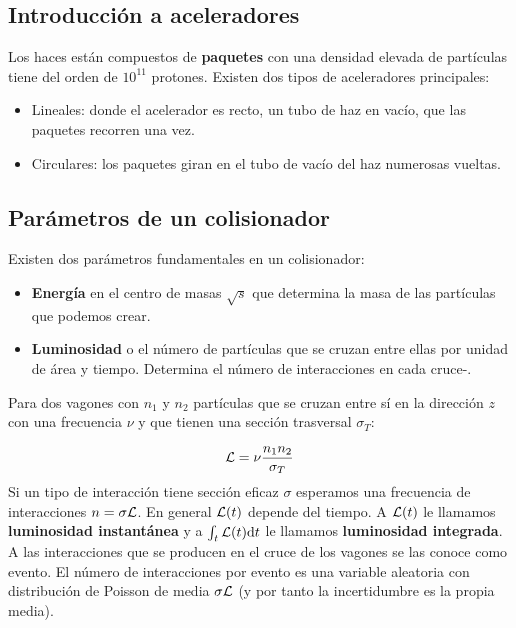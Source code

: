 \subsection{Introducción a aceleradores}

Los haces están compuestos de \textbf{paquetes} con una densidad elevada de partículas tiene del orden de $10^{11}$ protones. Existen dos tipos de aceleradores principales:

\begin{itemize}
	\item Lineales: donde el acelerador es recto, un tubo de haz en vacío, que las paquetes recorren una vez.
	\item Circulares: los paquetes giran en el tubo de vacío del haz numerosas vueltas.
\end{itemize}

\subsection{Parámetros de un colisionador}

Existen dos parámetros fundamentales en un colisionador:

\begin{itemize}
	\item \textbf{Energía} en el centro de masas $\sqrt{s}$ que determina la masa de las partículas que podemos crear.
	\item \textbf{Luminosidad} o el número de partículas que se cruzan entre ellas por unidad de área y tiempo. Determina el número de interacciones en cada cruce-.
\end{itemize}

Para dos vagones con $n_1$ y $n_2$ partículas que se cruzan entre sí en la dirección $z$ con una frecuencia $\nu$ y que tienen una sección trasversal $\sigma_T$:

\begin{equation}
	\mathcal{L} = \nu \frac{n_1n_2}{\sigma_T}
\end{equation}
Si un tipo de interacción tiene sección eficaz $\sigma$ esperamos una frecuencia de interacciones $n=\sigma \mathcal{L}$. En general $\mathcal{L}(t)$ depende del tiempo. A $\mathcal{L}(t)$ le llamamos \textbf{luminosidad instantánea} y a $\int_t \mathcal{L} (t)\mathrm{d} t$ le llamamos \textbf{luminosidad integrada}. A las interacciones que se producen en el cruce de los vagones se las conoce como evento. El número de interacciones por evento es una variable aleatoria con distribución de Poisson de media $\sigma \mathcal{L}$ (y por tanto la incertidumbre es la propia media).

